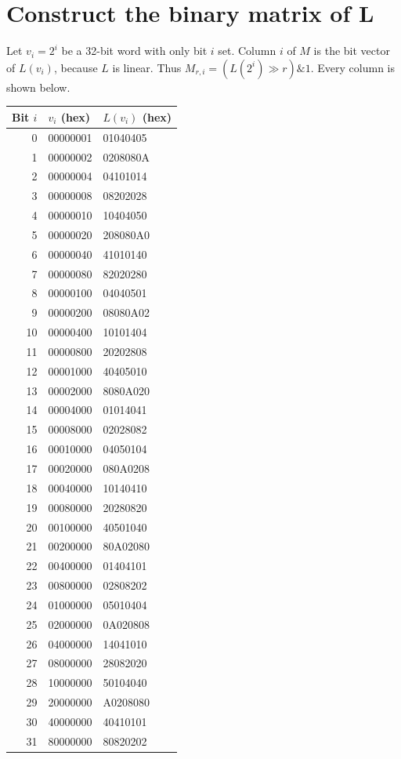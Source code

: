 \section{Construct the binary matrix of L}
Let $v_i=2^i$ be a 32-bit word with only bit $i$ set. Column $i$ of $M$ is the bit vector of $L(v_i)$, because $L$ is linear. Thus $M_{r,i}=(L(2^i)\gg r)\mathbin{\&}1$. Every column is shown below.
\begingroup\small
\begin{longtable}{rll}
\toprule
Bit $i$ & $v_i$ (hex) & $L(v_i)$ (hex)\\\midrule
\endhead
0 & 00000001 & 01040405\\
1 & 00000002 & 0208080A\\
2 & 00000004 & 04101014\\
3 & 00000008 & 08202028\\
4 & 00000010 & 10404050\\
5 & 00000020 & 208080A0\\
6 & 00000040 & 41010140\\
7 & 00000080 & 82020280\\
8 & 00000100 & 04040501\\
9 & 00000200 & 08080A02\\
10 & 00000400 & 10101404\\
11 & 00000800 & 20202808\\
12 & 00001000 & 40405010\\
13 & 00002000 & 8080A020\\
14 & 00004000 & 01014041\\
15 & 00008000 & 02028082\\
16 & 00010000 & 04050104\\
17 & 00020000 & 080A0208\\
18 & 00040000 & 10140410\\
19 & 00080000 & 20280820\\
20 & 00100000 & 40501040\\
21 & 00200000 & 80A02080\\
22 & 00400000 & 01404101\\
23 & 00800000 & 02808202\\
24 & 01000000 & 05010404\\
25 & 02000000 & 0A020808\\
26 & 04000000 & 14041010\\
27 & 08000000 & 28082020\\
28 & 10000000 & 50104040\\
29 & 20000000 & A0208080\\
30 & 40000000 & 40410101\\
31 & 80000000 & 80820202\\
\bottomrule\end{longtable}
\endgroup
